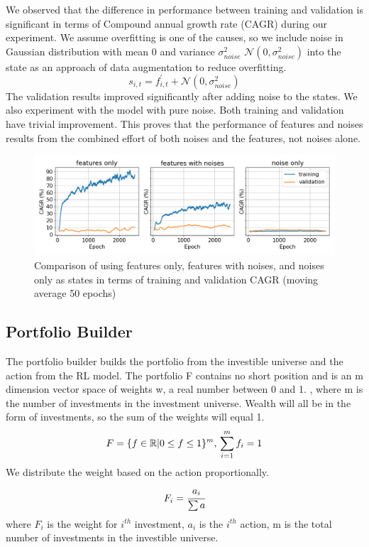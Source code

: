 We observed that the difference in performance between training and validation is significant in terms of Compound annual growth rate (CAGR) during our experiment. We assume overfitting is one of the causes, so we include noise in Gaussian distribution with mean 0 and variance \(\sigma_{noise}^2\) \(\mathcal{N}(0,\sigma_{noise}^2)\) into the state as an approach of data augmentation to reduce overfitting.
\[
    s_{i,t} = f^{'}_{i,t} + \mathcal{N}(0,\sigma_{noise}^2)
\]
The validation results improved significantly after adding noise to the states. We also experiment with the model with pure noise. Both training and validation have trivial improvement. This proves that the performance of features and noises results from the combined effort of both noises and the features, not noises alone.
\begin{figure}[ht]
  \includegraphics[width=15cm]{images/compare_noise.png}
  \caption [Comparison of features/noise] {Comparison of using features only, features with noises, and noises only as states in terms of training and validation CAGR (moving average 50 epochs)}
  \label{fig:noise_diagram}
\end{figure}

\subsection {Portfolio Builder}
The portfolio builder builds the portfolio from the investible universe and the action from the RL model.
The portfolio F contains no short position and is an m dimension vector space of weights w, a real number between 0 and 1. , where m is the number of investments in the investment universe. Wealth will all be in the form of investments, so the sum of the weights will equal 1.
\[
    F = \{ {f \in \mathbb{R} | 0 \leq f \leq 1 } \} ^m,
    \\
    \sum_{i=1}^m {f_i} =1
\]
We distribute the weight based on the action proportionally.
\[
    F_i = \cfrac{a_i}{\sum a} 
\]
where \(F_i\) is the weight for \(i^{th}\) investment, \(a_i\) is the  \(i^{th}\) action, m is the total number of investments in the investible universe. 
